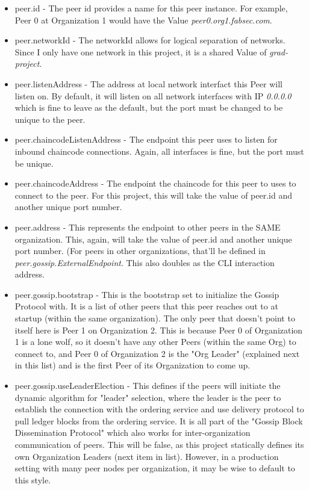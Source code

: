 \begin{itemize}
						\begin{itemize}
							\item peer.id - The peer id provides a name for this peer instance. For example, Peer 0 at Organization 1 would have the Value \textit{peer0.org1.fabsec.com}.
							\item peer.networkId - The networkId allows for logical separation of networks. Since I only have one network in this project, it is a shared Value of \textit{grad-project}.
							\item peer.listenAddress - The address at local network interfact this Peer will listen on. By default, it will listen on all network interfaces with IP \textit{0.0.0.0} which is fine to leave as the default, but the port must be changed to be unique to the peer.
							\item peer.chaincodeListenAddress - The endpoint this peer uses to listen for inbound chaincode connections. Again, all interfaces is fine, but the port must be unique.
							\item peer.chaincodeAddress - The endpoint the chaincode for this peer to uses to connect to the peer. For this project, this will take the value of peer.id and another unique port number.
							\item peer.address - This represents the endpoint to other peers in the SAME organization. This, again, will take the value of peer.id and another unique port number. (For peers in other organizations, that'll be defined in \textit{peer.gossip.ExternalEndpoint}. This also doubles as the CLI interaction address.
							\item peer.gossip.bootstrap - This is the bootstrap set to initialize the Gossip Protocol with. It is a list of other peers that this peer reaches out to at startup (within the same organization). The only peer that doesn't point to itself here is Peer 1 on Organization 2. This is because Peer 0 of Organization 1 is a lone wolf, so it doesn't have any other Peers (within the same Org) to connect to, and Peer 0 of Organization 2 is the "Org Leader" (explained next in this list) and is the first Peer of its Organization to come up.
							\item peer.gossip.useLeaderElection - This defines if the peers will initiate the dynamic algorithm for "leader" selection, where the leader is the peer to establish the connection with the ordering service and use delivery protocol to pull ledger blocks from the ordering service. It is all part of the "Gossip Block Dissemination Protocol" which also works for inter-organization communication of peers. This will be false, as this project statically defines its own Organization Leaders (next item in list). However, in a production setting with many peer nodes per organization, it may be wise to default to this style.

\end{itemize}
\end{itemize}
